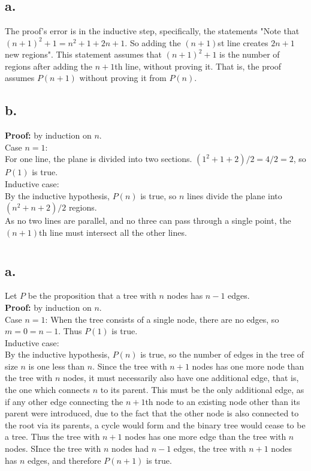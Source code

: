 \documentclass[11pt]{article}
\begin{document}
\section{}
\subsection*{a.}
The proof's error is in the inductive step, specifically, the statements "Note that $(n+1)^2 + 1 = n^2 + 1 + 2n + 1$. So adding the $(n+1)$st line creates $2n+1$ new regions". This statement assumes that $(n+1)^2 + 1$ is the number of regions after adding the $n+1$th line, without proving it. That is, the proof assumes $P(n+1)$ without proving it from $P(n)$.  

\subsection*{b.}
\textbf{Proof: } by induction on $n$. \\ 
Case $n = 1$: \\ 
For one line, the plane is divided into two sections. $(1^2 + 1 + 2)/ 2 = 4 / 2 = 2$, so $P(1)$ is true. \\ 
Inductive case: \\ 
By the inductive hypothesis, $P(n)$ is true, so $n$ lines divide the plane into $(n^2 + n + 2)/2$ regions. \\ 
As no two lines are parallel, and no three can pass through a single point, the $(n+1)$th line must intersect all the other lines. \\

\section{}
\subsection*{a.}
Let $P$ be the proposition that a tree with $n$ nodes has $n - 1$ edges. \\ 
\textbf{Proof:} by induction on $n$. \\ 
Case $n = 1$: When the tree consists of a single node, there are no edges, so $m = 0 = n - 1$. Thus $P(1)$ is true. \\ 

Inductive case: \\ 
By the inductive hypothesis, $P(n)$ is true, so the number of edges in the tree of size $n$ is one less than $n$. Since the tree with $n+1$ nodes has one more node than the tree with $n$ nodes, it must necessarily also have one additional edge, that is, the one which connects $n$ to its parent. This must be the only additional edge, as if any other edge connecting the $n+1$th node to an existing node other than its parent were introduced, due to the fact that the other node is also connected to the root via its parents, a cycle would form and the binary tree would cease to be a tree. Thus the tree with $n+1$ nodes has one more edge than the tree with $n$ nodes. SInce the tree with $n$ nodes had $n-1$ edges, the tree with $n+1$ nodes has $n$ edges, and therefore $P(n+1)$ is true.
\end{document}
